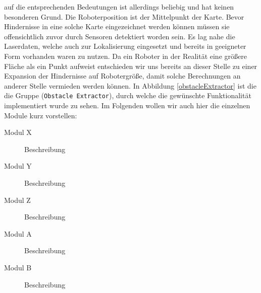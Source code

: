  auf die entsprechenden Bedeutungen ist allerdings beliebig und hat keinen besonderen Grund.
 Die Roboterposition ist der Mittelpunkt der Karte. Bevor Hindernisse in eine solche Karte eingezeichnet werden
 können müssen sie offensichtlich zuvor durch Sensoren detektiert worden sein. Es lag nahe die Laserdaten,
 welche auch zur Lokalisierung eingesetzt und bereits in geeigneter Form vorhanden waren zu nutzen.
 Da ein Roboter in der Realität eine größere Fläche als ein Punkt aufweist entschieden wir uns bereits an dieser
 Stelle zu einer Expansion der Hindernisse auf Robotergröße, damit solche Berechnungen an anderer Stelle vermieden
 werden können.
 In Abbildung \ref{obstacleExtractor} ist die die Gruppe (\lstinline{Obstacle Extractor}),
 durch welche die gewünschte Funktionalität implementiert wurde zu sehen.
 Im Folgenden wollen wir auch hier die einzelnen Module kurz vorstellen:


\begin{description}
\item[Modul X] Beschreibung
\item[Modul Y] Beschreibung
\item[Modul Z] Beschreibung
\item[Modul A] Beschreibung
\item[Modul B] Beschreibung
\end{description}



